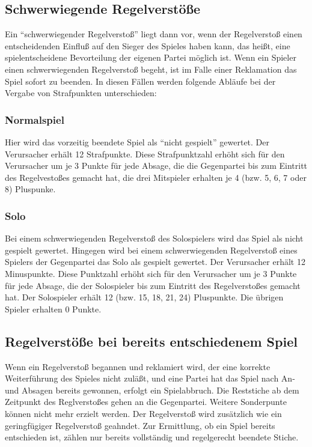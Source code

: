 \documentclass[12pt]{scrartcl}
\begin{document}
\subsection{Schwerwiegende Regelverstöße}
Ein "`schwerwiegender Regelverstoß"' liegt dann vor, wenn der
Regelverstoß einen entscheidenden Einfluß auf den Sieger des
Spieles haben kann, das heißt, eine spielentscheidene
Bevorteilung der eigenen Partei möglich ist. Wenn ein Spieler
einen schwerwiegenden Regelverstoß begeht, ist im Falle einer
Reklamation das Spiel sofort  zu beenden. In diesen Fällen
werden folgende Abläufe bei der Vergabe von Strafpunkten
unterschieden:

\subsubsection{Normalspiel}
Hier wird das vorzeitig beendete Spiel als "`nicht
gespielt"' gewertet. Der Verursacher erhält 12 Strafpunkte.
Diese Strafpunktzahl erhöht sich für den Verursacher um je 3
Punkte für jede Absage, die die Gegenpartei bis zum Eintritt des
Regelvestoßes gemacht hat, die drei Mitspieler erhalten je 4
(bzw. 5, 6, 7 oder 8) Pluspunke.

\subsubsection{Solo}
Bei einem schwerwiegenden Regelverstoß des Solospielers
wird das Spiel als nicht gespielt gewertet. Hingegen wird bei
einem schwerwiegenden Regelverstoß eines Spielers der
Gegenpartei das Solo als gespielt gewertet. Der Verursacher
erhält 12 Minuspunkte. Diese Punktzahl erhöht sich für den
Verursacher um je 3 Punkte für jede Absage, die der Solospieler
bis zum Eintritt des Regelverstoßes gemacht hat. Der Solospieler
erhält 12 (bzw. 15, 18, 21, 24) Pluspunkte. Die übrigen Spieler
erhalten 0 Punkte.

\subsection{Regelverstöße bei bereits entschiedenem Spiel}
Wenn ein Regelverstoß begannen und reklamiert wird, der eine
korrekte Weiterführung des Spieles nicht zuläßt, und eine
Partei hat das Spiel nach An- und Absagen bereits gewonnen,
erfolgt ein Spielabbruch. Die Reststiche ab dem Zeitpunkt des
Reglverstoßes gehen an die Gegenpartei. Weitere Sonderpunte
können nicht mehr erzielt werden. Der Regelverstoß wird
zusätzlich wie ein geringfügiger Regelverstoß geahndet. Zur
Ermittlung, ob ein Spiel bereits entschieden ist, zählen nur
bereits vollständig und regelgerecht beendete Stiche.
\end{document}
